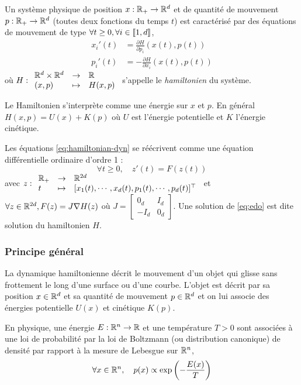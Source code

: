 \documentclass[10pt,a4paper]{article}
\begin{document}
Un système physique de position $x : \mathbb{R}_+ \to \mathbb{R}^d$ et de quantité de mouvement $p : \mathbb{R}_+ \to \mathbb{R}^d$ (toutes deux fonctions du temps $t$) est caractérisé par des équations de mouvement de type $\forall t \geq 0, \forall i \in {\left\llbracket 1,d \right\rrbracket}$, 
\begin{equation}\label{eq:hamiltonian-dyn}
	\begin{aligned}
		x_i'(t) &= \frac{\partial H}{\partial p_i} (x(t), p(t)) \\
		p_i' (t) &= -\frac{\partial H}{\partial x_i} (x(t), p(t))
	\end{aligned}
\end{equation}
où $H : { \begin{array}{lcl} \mathbb{R}^d \times \mathbb{R}^d & \to & \mathbb{R} \\ (x,p) & \mapsto & H(x,p) \end{array} }$ s'appelle le {\it hamiltonien} du système.

Le Hamiltonien s'interprète comme une énergie sur $x$ et $p$. En général $H(x,p) = U(x) + K(p)$ où $U$ est l'énergie potentielle et $K$ l'énergie cinétique.

\begin{Rque}\label{rque:edo}
	Les équations \eqref{eq:hamiltonian-dyn} se réécrivent comme une équation différentielle ordinaire d'ordre 1 :
	\begin{equation}\label{eq:edo}
		\forall t \geq 0, \quad z'(t) = F(z(t))
		\tag{EDO}
	\end{equation}
	avec $z : { \begin{array}{lcl}  \mathbb{R}_+ & \to & \mathbb{R}^{2d} \\ t & \mapsto & [x_1(t), \cdots, x_d(t), p_1(t), \cdots, p_d(t)]^\top \end{array} }$ et $\forall z \in \mathbb{R}^{2d}, F(z) = J \nabla H (z)$ où
	$J = \begin{bmatrix}
		0_{d} & I_{d} \\
		-I_{d} & 0_{d}
	\end{bmatrix}$.
	Une solution de \eqref{eq:edo} est dite solution du hamiltonien $H$.
\end{Rque}

\subsubsection{Principe général}

La dynamique hamiltonienne décrit le mouvement d'un objet qui glisse sans frottement le long d'une surface ou d'une courbe. L'objet est décrit par sa position $x \in \mathbb{R}^d$ et sa quantité de mouvement $p \in \mathbb{R}^d$ et on lui associe des énergies potentielle $U(x)$ et cinétique $K(p)$.

\begin{Def}
	En physique, une énergie $E : \mathbb{R}^n \to \mathbb{R}$ et une température $T > 0$ sont associées à une loi de probabilité par la loi de Boltzmann (ou distribution canonique) de densité par rapport à la mesure de Lebesgue sur $\mathbb{R}^n$,
	$$\forall x \in \mathbb{R}^n,  \quad p(x) \propto \exp \left( -\frac{E(x)}{T} \right)$$
\end{Def}
\end{document}
